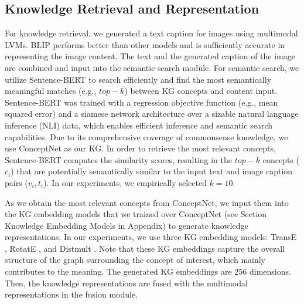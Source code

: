 \subsection{Knowledge Retrieval and Representation}
\label{sec:explicit-knowledge}
For knowledge retrieval, we generated a text caption for images using multimodal LVMs. 
BLIP \cite{li2022blip} performs better than
other models and is sufficiently accurate in representing the image content. The text and the generated caption of the image are combined and input into the semantic search module. For semantic search, we utilize Sentence-BERT \cite{reimers2019sentence} 
to search efficiently and find the most semantically meaningful matches (e.g., $top-k$) between  KG concepts and content input. Sentence-BERT was trained with a regression objective function (e.g., mean squared error) and a siamese network architecture over a sizable natural language inference (NLI) data, which enables efficient inference and semantic search capabilities. 
Due to its comprehensive coverage of commonsense knowledge, we use ConceptNet \cite{speer2018conceptnet} as our KG. In order to retrieve the most relevant concepts, Sentence-BERT computes the similarity scores, resulting in the $top-k$ concepts ($c_i$) that are potentially semantically similar to the input text and image caption pairs ($v_i,t_i$). In our experiments, we empirically selected $k= 10$. 


As we obtain the most relevant concepts from ConceptNet, we input them into the KG embedding models that we trained over ConceptNet (see Section Knowledge Embedding Models in Appendix) to generate knowledge representations. In our experiments, we use three KG embedding models: TransE \cite{bordes2013translating}, RotatE \cite{sun2019rotate}, and Distmult \cite{Yang2014-yd}. Note that these KG embeddings capture the overall structure of the graph surrounding the concept of interest, which mainly contributes to the meaning. The generated KG embeddings are 256 dimensions. 
Then, the knowledge representations are fused with the multimodal representations in the fusion module. 


